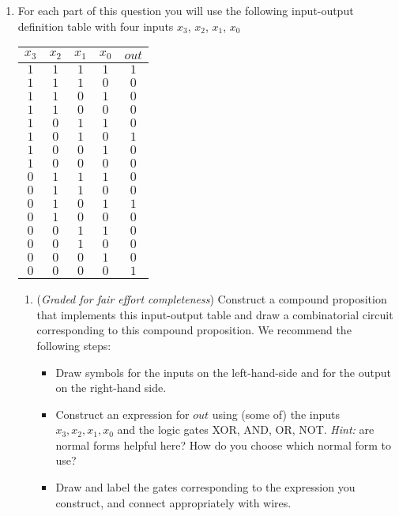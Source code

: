 \begin{enumerate}
\begin{enumerate}
   {\it Bonus; not for credit (do not hand in)}: How would you translate each of the equivalent compound
   propositions in English? Does doing so help illustrate why they are equivalent?
   \end{enumerate}
   
   \item For each part of this question you will use the following input-output definition table 
   with four inputs $x_3$, $x_2$, $x_1$, $x_0$
   
   \begin{center}
   \begin{tabular}{cccc|c}
   $x_3$ & $x_2$ & $x_1$ & $x_0$ & $out$\\
   \hline
   $1$ & $1$ & $1$ & $1$ & $1$\\
   $1$ & $1$ & $1$ & $0$ & $0$\\
   $1$ & $1$ & $0$ & $1$ & $0$\\
   $1$ & $1$ & $0$ & $0$ & $0$\\
   $1$ & $0$ & $1$ & $1$ & $0$\\
   $1$ & $0$ & $1$ & $0$ & $1$\\
   $1$ & $0$ & $0$ & $1$ & $0$\\
   $1$ & $0$ & $0$ & $0$ & $0$\\
   $0$ & $1$ & $1$ & $1$ & $0$\\
   $0$ & $1$ & $1$ & $0$ & $0$\\
   $0$ & $1$ & $0$ & $1$ & $1$\\
   $0$ & $1$ & $0$ & $0$ & $0$\\
   $0$ & $0$ & $1$ & $1$ & $0$\\
   $0$ & $0$ & $1$ & $0$ & $0$\\
   $0$ & $0$ & $0$ & $1$ & $0$\\
   $0$ & $0$ & $0$ & $0$ & $1$\\
   \end{tabular}
   \end{center}
   \begin{enumerate}   
   \item  ({\it Graded for fair effort completeness}) 
   Construct a compound proposition that implements this input-output table
   and draw a combinatorial circuit corresponding to this compound proposition. We recommend
   the following steps:
   
   \begin{itemize}
   \item Draw symbols for the inputs on the left-hand-side and for the output on the right-hand side.
   \item Construct an expression for $out$ using (some of) the inputs 
   $x_3, x_2, x_1, x_0$ and the logic gates XOR, AND, OR, NOT. {\it Hint:} are normal forms helpful here?
   How do you choose which normal form to use?
   \item Draw and label the gates corresponding to the expression you construct, and connect appropriately with wires.
   \end{itemize}
   

\end{enumerate}
\end{enumerate}
